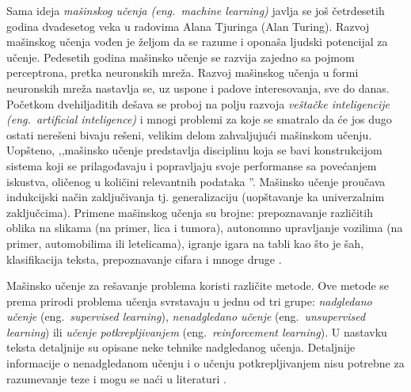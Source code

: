 \documentclass[12pt,oneside]{memoir}
\begin{document}
Sama ideja \textit{mašinskog učenja (eng.~machine learning)} javlja se još četrdesetih godina dvadesetog veka u radovima Alana Tjuringa (Alan Turing). Razvoj mašinskog učenja vođen je željom da se razume i oponaša ljudski potencijal za učenje. Pedesetih godina mašinsko učenje se razvija zajedno sa pojmom perceptrona, pretka neuronskih mreža. %
Razvoj mašinskog učenja u formi neuronskih mreža nastavlja se, uz uspone i padove interesovanja, sve do danas. Početkom dvehiljaditih dešava se proboj na polju razvoja \textit{veštačke inteligencije (eng.~artificial inteligence)} i mnogi problemi za koje se smatralo da će jos dugo ostati nerešeni bivaju rešeni, velikim delom zahvaljujući mašinskom učenju. Uopšteno, ,,mašinsko učenje predstavlja disciplinu koja se bavi konstrukcijom sistema koji se prilagođavaju i popravljaju svoje performanse sa povećanjem iskustva, oličenog u količini relevantnih podataka \cite{mladen}''. Mašinsko učenje proučava indukcijski način zaključivanja tj. generalizaciju (uopštavanje ka univerzalnim zaključcima). Primene mašinskog učenja su brojne: prepoznavanje različitih oblika na slikama (na primer, lica i tumora), autonomno upravljanje vozilima (na primer, automobilima ili letelicama), igranje igara na tabli kao što je šah, klasifikacija teksta, prepoznavanje cifara i mnoge druge \cite{mladen}.

Mašinsko učenje za rešavanje problema koristi različite metode. Ove metode se prema prirodi problema učenja svrstavaju u jednu od tri grupe: \textit{nadgledano učenje} (eng.~\textit{supervised learning}), \textit{nenadgledano učenje} (eng.~\textit{unsupervised learning}) ili \textit{učenje potkrepljivanjem} (eng.~\textit{reinforcement learning}). U nastavku teksta detaljnije su opisane neke tehnike nadgledanog učenja. Detaljnije informacije o nenadgledanom učenju i o učenju potkrepljivanjem nisu potrebne za razumevanje teze i mogu se naći u literaturi \cite{mlm, reinforcement-learning, mladen}.
\end{document}
